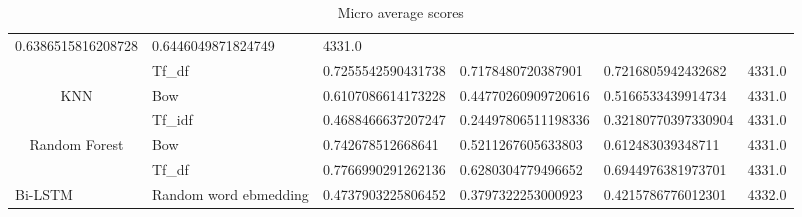 \begin{table}[h!]
{\begin{tabular}{@{}clllll@{}}
  \multicolumn{1}{l|}{0.6386515816208728} &
  \multicolumn{1}{l|}{0.6446049871824749} &
  \multicolumn{1}{l|}{4331.0} \\ \cmidrule(l){2-6} 
\multicolumn{1}{|c|}{} &
  \multicolumn{1}{l|}{Tf\_df} &
  \multicolumn{1}{l|}{0.7255542590431738} &
  \multicolumn{1}{l|}{0.7178480720387901} &
  \multicolumn{1}{l|}{0.7216805942432682} &
  \multicolumn{1}{l|}{4331.0} \\ \midrule
\multicolumn{1}{|c|}{\multirow{2}{*}{KNN}} &
  \multicolumn{1}{l|}{Bow} &
  \multicolumn{1}{l|}{0.6107086614173228} &
  \multicolumn{1}{l|}{0.44770260909720616} &
  \multicolumn{1}{l|}{0.5166533439914734} &
  \multicolumn{1}{l|}{4331.0} \\ \cmidrule(l){2-6} 
\multicolumn{1}{|c|}{} &
  \multicolumn{1}{l|}{Tf\_idf} &
  \multicolumn{1}{l|}{0.4688466637207247} &
  \multicolumn{1}{l|}{0.24497806511198336} &
  \multicolumn{1}{l|}{0.32180770397330904} &
  \multicolumn{1}{l|}{4331.0} \\ \midrule
\multicolumn{1}{|c|}{\multirow{2}{*}{Random Forest}} &
  \multicolumn{1}{l|}{Bow} &
  \multicolumn{1}{l|}{0.742678512668641} &
  \multicolumn{1}{l|}{0.5211267605633803} &
  \multicolumn{1}{l|}{0.612483039348711} &
  \multicolumn{1}{l|}{4331.0} \\ \cmidrule(l){2-6} 
\multicolumn{1}{|c|}{} &
  \multicolumn{1}{l|}{Tf\_df} &
  \multicolumn{1}{l|}{0.7766990291262136} &
  \multicolumn{1}{l|}{0.6280304779496652} &
  \multicolumn{1}{l|}{0.6944976381973701} &
  \multicolumn{1}{l|}{4331.0} \\ \midrule
\multicolumn{1}{|l|}{Bi-LSTM} &
  \multicolumn{1}{l|}{Random word ebmedding} &
  \multicolumn{1}{l|}{0.4737903225806452} &
  \multicolumn{1}{l|}{0.3797322253000923} &
  \multicolumn{1}{l|}{0.4215786776012301} &
  \multicolumn{1}{l|}{4332.0} \\ \bottomrule
\end{tabular}%
}
\caption{Micro average scores}
\label{tab:Micro-average}
\end{table}

